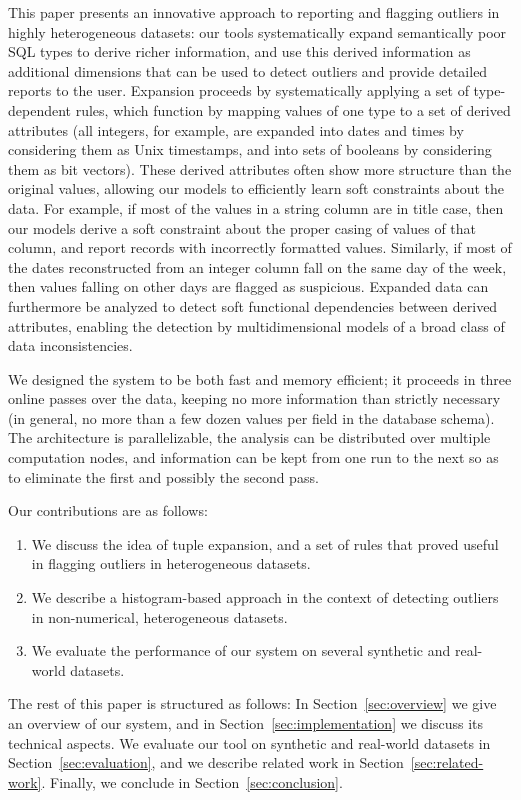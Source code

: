 This paper presents an innovative approach to reporting and flagging outliers in highly heterogeneous datasets: our tools systematically expand semantically poor SQL types to derive richer information, and use this derived information as additional dimensions that can be used to detect outliers and provide detailed reports to the user. Expansion proceeds by systematically applying a set of type-dependent rules, which function by mapping values of one type to a set of derived attributes (all integers, for example, are expanded into dates and times by considering them as Unix timestamps, and into sets of booleans by considering them as bit vectors). These derived attributes often show more structure than the original values, allowing our models to efficiently learn soft constraints about the data. For example, if most of the values in a string column are in title case, then our models derive a soft constraint about the proper casing of values of that column, and report records with incorrectly formatted values. Similarly, if most of the dates reconstructed from an integer column fall on the same day of the week, then values falling on other days are flagged as suspicious. Expanded data can furthermore be analyzed to detect soft functional dependencies between derived attributes, enabling the detection by multidimensional models of a broad class of data inconsistencies.

We designed the system to be both fast and memory efficient; it proceeds in three online passes over the data, keeping no more information than strictly necessary (in general, no more than a few dozen values per field in the database schema). The architecture is parallelizable, the analysis can be distributed over multiple computation nodes, and information can be kept from one run to the next so as to eliminate the first and possibly the second pass.

Our contributions are as follows:
\begin{enumerate}
\item We discuss the idea of tuple expansion, and a set of rules that proved useful in flagging outliers in heterogeneous datasets.
\item We describe a histogram-based approach in the context of detecting outliers in non-numerical, heterogeneous datasets.
\item We evaluate the performance of our system on several synthetic and real-world datasets.
\end{enumerate}

The rest of this paper is structured as follows: In Section~\ref{sec:overview} we give an overview of our system, and in Section~\ref{sec:implementation} we discuss its technical aspects. We evaluate our tool on synthetic and real-world datasets in Section~\ref{sec:evaluation}, and we describe related work in Section~\ref{sec:related-work}. Finally, we conclude in Section~\ref{sec:conclusion}. %